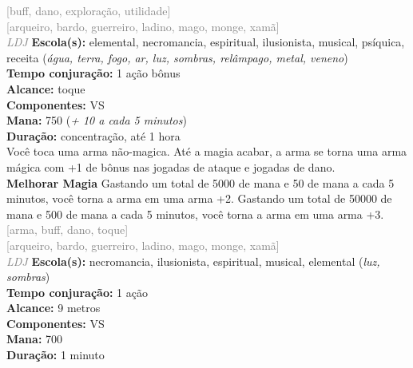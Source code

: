 \documentclass{RPG_Adventure}[2021/10/20]
\begin{document}
{\scriptsize \textcolor{gray}{[buff, dano, exploração, utilidade]\\}}
{\scriptsize \textcolor{gray}{[arqueiro, bardo, guerreiro, ladino, mago, monge, xamã]\\}}
{\tiny \textcolor{gray}{\textit{LDJ}}}\jump{}
{\small \t \textbf{Escola(s):} elemental, necromancia, espiritual, ilusionista, musical, psíquica, receita (\textit{água, terra, fogo, ar, luz, sombras, relâmpago, metal, veneno})\\\t \textbf{Tempo conjuração:} 1 ação bônus\\\t \textbf{Alcance:} toque\\\t \textbf{Componentes:} VS\\\t \textbf{Mana:} 750 (\textit{+ 10 a cada 5 minutos})\\\t \textbf{Duração:} concentração, até 1 hora\\}
{\normalsize Você toca uma arma não-magica. Até a magia acabar, a arma se torna uma arma mágica com +1 de bônus nas jogadas de ataque e jogadas de dano.\\\t \textbf{Melhorar Magia} Gastando um total de 5000 de mana e 50 de mana a cada 5 minutos, você torna a arma em uma arma +2. Gastando um total de 50000 de mana e 500 de mana a cada 5 minutos, você torna a arma em uma arma +3.\\}
{\scriptsize \textcolor{gray}{[arma, buff, dano, toque]\\}}
{\scriptsize \textcolor{gray}{[arqueiro, bardo, guerreiro, ladino, mago, monge, xamã]\\}}
{\tiny \textcolor{gray}{\textit{LDJ}}}\jump{}
{\small \t \textbf{Escola(s):} necromancia, ilusionista, espiritual, musical, elemental (\textit{luz, sombras})\\\t \textbf{Tempo conjuração:} 1 ação\\\t \textbf{Alcance:} 9 metros\\\t \textbf{Componentes:} VS\\\t \textbf{Mana:} 700\\\t \textbf{Duração:} 1 minuto\\}
\end{document}
